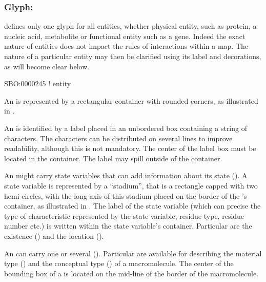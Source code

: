 
\subsubsection{Glyph: }
\label{sec:entity}

\SBGNERLone defines only one glyph for all entities, whether physical entity, such as protein, a nucleic acid, metabolite or functional entity such as a gene. Indeed the exact nature of entities does not impact the rules of interactions within a map. The nature of a particular entity may then be clarified using its label and decorations, as will become clear below. 

\begin{glyphDescription}

\glyphSboTerm SBO:0000245 ! entity 

\glyphContainer An  is represented by a rectangular container with rounded corners, as illustrated in .

\glyphLabel An  is identified by a label placed in an unbordered box containing a string of characters.  The characters can be distributed on several lines to improve readability, although this is not mandatory.  The center of the label box must be located in the container. The label may spill outside of the container. 

\glyphAux An  might carry state variables that can add information about its state ().  A state variable is represented by a ``stadium'', that is a rectangle capped with two hemi-circles, with the long axis of this stadium placed on the border of the 's container, as illustrated in .  The label of the state variable (which can precise the type of characteristic represented by the state variable, residue type, residue number etc.) is written within the state variable's container. Particular  are the existence () and the location ().

An  can carry one or several  ().  Particular  are available for describing the material type () and the conceptual type () of a macromolecule.  The center of the bounding box of a  is located on the mid-line of the border of the macromolecule.

\end{glyphDescription}

